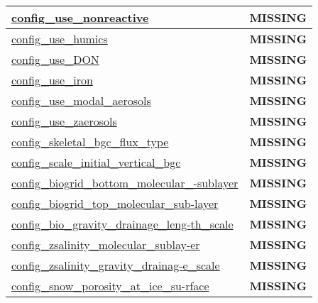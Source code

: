 {\begin{center}
\begin{longtable}{| p{2.0in} || p{4.0in} |}
    \hline
    \hyperref[subsec:nm_sec_config_use_nonreactive]{config\_use\_nonreactive} & {\bf \color{red} MISSING} \\
    \hline
    \hyperref[subsec:nm_sec_config_use_humics]{config\_use\_humics} & {\bf \color{red} MISSING} \\
    \hline
    \hyperref[subsec:nm_sec_config_use_DON]{config\_use\_DON} & {\bf \color{red} MISSING} \\
    \hline
    \hyperref[subsec:nm_sec_config_use_iron]{config\_use\_iron} & {\bf \color{red} MISSING} \\
    \hline
    \hyperref[subsec:nm_sec_config_use_modal_aerosols]{config\_use\_modal\_aerosols} & {\bf \color{red} MISSING} \\
    \hline
    \hyperref[subsec:nm_sec_config_use_zaerosols]{config\_use\_zaerosols} & {\bf \color{red} MISSING} \\
    \hline
    \hyperref[subsec:nm_sec_config_skeletal_bgc_flux_type]{config\_skeletal\_bgc\_flux\_type} & {\bf \color{red} MISSING} \\
    \hline
    \hyperref[subsec:nm_sec_config_scale_initial_vertical_bgc]{config\_scale\_initial\_vertical\_bgc} & {\bf \color{red} MISSING} \\
    \hline
    \hyperref[subsec:nm_sec_config_biogrid_bottom_molecular_sublayer]{config\_biogrid\_bottom\_molecular\_-}\hyperref[subsec:nm_sec_config_biogrid_bottom_molecular_sublayer]{sublayer}& {\bf \color{red} MISSING} \\
    \hline
    \hyperref[subsec:nm_sec_config_biogrid_top_molecular_sublayer]{config\_biogrid\_top\_molecular\_sub-}\hyperref[subsec:nm_sec_config_biogrid_top_molecular_sublayer]{layer}& {\bf \color{red} MISSING} \\
    \hline
    \hyperref[subsec:nm_sec_config_bio_gravity_drainage_length_scale]{config\_bio\_gravity\_drainage\_leng-}\hyperref[subsec:nm_sec_config_bio_gravity_drainage_length_scale]{th\_scale}& {\bf \color{red} MISSING} \\
    \hline
    \hyperref[subsec:nm_sec_config_zsalinity_molecular_sublayer]{config\_zsalinity\_molecular\_sublay-}\hyperref[subsec:nm_sec_config_zsalinity_molecular_sublayer]{er}& {\bf \color{red} MISSING} \\
    \hline
    \hyperref[subsec:nm_sec_config_zsalinity_gravity_drainage_scale]{config\_zsalinity\_gravity\_drainag-}\hyperref[subsec:nm_sec_config_zsalinity_gravity_drainage_scale]{e\_scale}& {\bf \color{red} MISSING} \\
    \hline
    \hyperref[subsec:nm_sec_config_snow_porosity_at_ice_surface]{config\_snow\_porosity\_at\_ice\_su-}\hyperref[subsec:nm_sec_config_snow_porosity_at_ice_surface]{rface}& {\bf \color{red} MISSING} \\

\end{longtable}
\end{center}}
